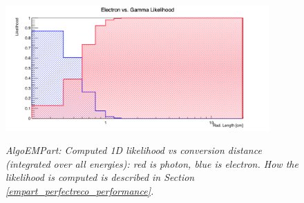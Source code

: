 \begin{figure}[ht!]
\centering
\includegraphics[width=0.9\textwidth]{Figures/EMPartTraining/mc_trained/Likelihood_radLen.png}\\
\caption{\textit{AlgoEMPart: Computed 1D likelihood vs conversion distance (integrated over all energies): red is photon, blue is electron. How the likelihood is computed is described in Section \ref{empart_perfectreco_performance}.}}
\label{empart_perfectreco_performance_fig5}
\end{figure}


